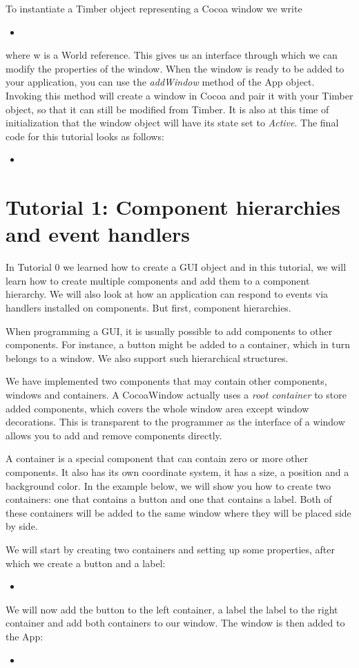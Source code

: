 \documentclass[a4paper]{article}
\newcommand{\timbercode}[2]
  {\begin{itemize}\item[]\end{itemize}}
\begin{document}
To instantiate a Timber object representing a Cocoa window we write
\timbercode{tutorial0part1}{}
where w is a World reference. This gives us an interface through which we can modify the properties of the window. When the window is ready to be added to your application, you can use the \textit{addWindow} method of the App object. Invoking this method will create a window in Cocoa and pair it with your Timber object, so that it can still be modified from Timber. It is also at this time of initialization that the window object will have its state set to \textit{Active}. The final code for this tutorial looks as follows:
\newpage
\timbercode{tutorial0part3}{}

\section*{Tutorial 1: Component hierarchies and event handlers}
In Tutorial 0 we learned how to create a GUI object and in this tutorial, we will learn how to create multiple components and add them to a component hierarchy. We will also look at how an application can respond to events via handlers installed on components. But first, component hierarchies.

When programming a GUI, it is usually possible to add components to other components. For instance, a button might be added to a container, which in turn belongs to a window. We also support such hierarchical structures.

We have implemented two components that may contain other components, windows and containers. A CocoaWindow actually uses a \textit{root container} to store added components, which covers the whole window area except window decorations. This is transparent to the programmer as the interface of a window allows you to add and remove components directly.

A container is a special component that can contain zero or more other components. It also has its own coordinate system, it has a size, a position and a background color. In the example below, we will show you how to create two containers: one that contains a button and one that contains a label. Both of these containers will be added to the same window where they will be placed side by side.

We will start by creating two containers and setting up some properties, after which we create a button and a label:

\timbercode{tutorial1part0}{}

We will now add the button to the left container, a label the label to the right container and add both containers to our window. The window is then added to the App:
\timbercode{tutorial1part1}{}
\end{document}
